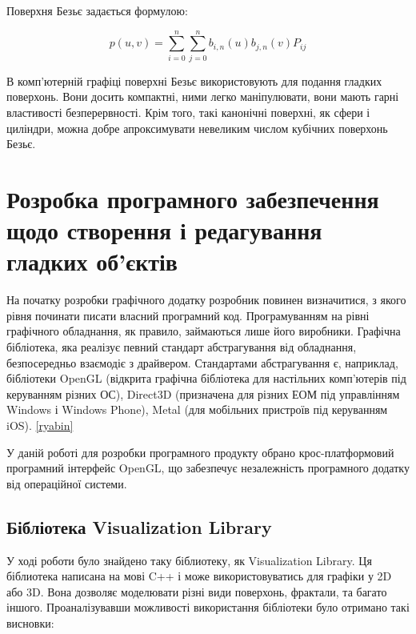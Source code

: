 \let\mypdfximage\pdfximage\def\pdfximage{\immediate\mypdfximage}\documentclass[14pt,a4paper]{extarticle}
\theoremstyle{definition}
\renewcommand{\[}{\begin{singlespace}\begin{equation*}}
\renewcommand{\]}{\end{equation*}\end{singlespace}}
\renewcommand{\+}{\discretionary{\mbox{\scriptsize$\hookleftarrow$}}{}{}}
\begin{document}
Поверхня Безьє задається формулою:
\[p(u,v)=\sum_{i=0}^n\sum_{j=0}^n b_{i,n}(u) b_{j,n}(v) P_{ij}\]

В комп'ютерній графіці поверхні Безьє використовують для подання гладких поверхонь. Вони досить компактні, ними легко маніпулювати, вони мають гарні властивості безперервності. Крім того, такі канонічні поверхні, як сфери і циліндри, можна добре апроксимувати невеликим числом кубічних поверхонь Безьє.

\section{Розробка програмного забезпечення щодо створення і редагування гладких об'єктів}

На початку розробки графічного додатку розробник повинен визначитися, з якого рівня починати писати власний програмний код. Програмуванням на рівні графічного обладнання, як правило, займаються лише його виробники. Графічна бібліотека, яка реалізує певний стандарт абстрагування від обладнання, безпосередньо взаємодіє з драйвером. Стандартами абстрагування є, наприклад, бібліотеки OpenGL (відкрита графічна бібліотека для настільних комп'ютерів під керуванням різних ОС), Direct3D (призначена для різних ЕОМ під управлінням Windows і Windows Phone), Metal (для мобільних пристроїв під керуванням iOS). \ref{ryabin}

У даній роботі для розробки програмного продукту обрано крос-платформовий програмний інтерфейс OpenGL, що забезпечує незалежність програмного додатку від операційної системи.

\subsection{Бібліотека Visualization Library}

У ході роботи було знайдено таку біблиотеку, як Visualization Library. Ця біблиотека написана на мові C++ і може використовуватись для графіки у 2D або 3D. Вона дозволяє моделювати різні види поверхонь, фрактали, та багато іншого. Проаналізувавши можливості використання бібліотеки було отримано такі висновки:
\end{document}
